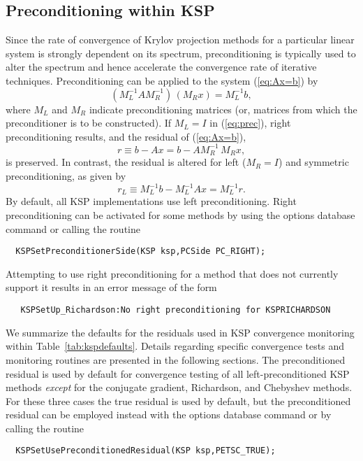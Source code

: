 \subsection{Preconditioning within KSP} 
\label{sec:ksppc}

Since the rate of convergence of Krylov projection methods for a
particular linear system is strongly dependent on its spectrum,
preconditioning is typically used to alter the spectrum and hence
accelerate the convergence rate of iterative techniques.
Preconditioning can be applied to the system (\ref{eq:Ax=b}) by
\begin{equation}
   (M_L^{-1} A M_R^{-1}) \, (M_R x) = M_L^{-1} b,
\label{eq:prec}
\end{equation}
where $ M_L$ and $ M_R $ indicate preconditioning matrices (or, matrices
from which the preconditioner is to be constructed).  If $ M_L = I $
in (\ref{eq:prec}), right preconditioning results, and the
residual of (\ref{eq:Ax=b}),
  \[ r \equiv b - Ax = b - A M_R^{-1} \, M_R x, \]
is preserved.  In contrast, the residual is altered for left 
($ M_R = I $) and symmetric preconditioning, as given by
  \[ r_L \equiv M_L^{-1} b - M_L^{-1} A x = M_L^{-1} r. \]
By default, all KSP implementations use left preconditioning.  
Right preconditioning can be activated for some methods by
using the options database command  or
calling the routine  
\begin{verbatim}
  KSPSetPreconditionerSide(KSP ksp,PCSide PC_RIGHT);
\end{verbatim}
Attempting to use right preconditioning for a method that
does not currently support it results in an error message of the form
\begin{verbatim}
   KSPSetUp_Richardson:No right preconditioning for KSPRICHARDSON
\end{verbatim}

We summarize the defaults for the residuals used in KSP convergence
monitoring within Table~\ref{tab:kspdefaults}.  Details regarding
specific convergence tests and monitoring routines are presented in
the following sections.  The preconditioned residual is used by
default for convergence testing of all left-preconditioned KSP
methods {\em except} for the conjugate gradient, Richardson, and
Chebyshev methods.  For these three cases the true residual is used by
default, but the preconditioned residual can be employed instead with
the options database command  or by calling the routine
\begin{verbatim}
  KSPSetUsePreconditionedResidual(KSP ksp,PETSC_TRUE);
\end{verbatim}

